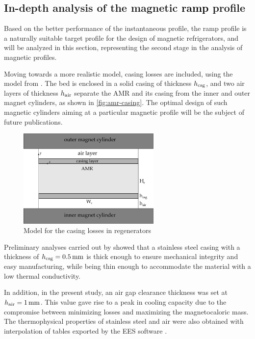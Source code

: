\documentclass[referee]{svjour3}
\begin{document}
\subsection{In-depth analysis of the  magnetic \textcolor{black}{ramp} profile}
\label{sec:performance-an-amr-1}

Based on the better performance of the instantaneous profile, the ramp profile is a naturally suitable target profile for the design of magnetic refrigerators, and will be analyzed in this section, representing the second stage in the analysis of magnetic profiles.

Moving towards a more realistic model, casing losses are included, using the model from \cite{bib:trevizoli16_perfor_model}. The bed is enclosed in a solid casing of thickness $h_{\mathrm{csg}}$, and two air layers of thickness $h_{\mathrm{air}}$ separate the AMR and its casing from the inner and outer magnet cylinders, as shown in \autoref{fig:amr-casing}. The optimal design of such magnetic cylinders aiming at a particular magnetic profile  will be the subject of future publications. 

\begin{figure}[!ht]
  \centering
  \includegraphics[width=7cm]{amr-casing}
  \caption{Model for the casing losses in regenerators}
  \label{fig:amr-casing}
\end{figure}


Preliminary analyses carried out by \cite{bib:peixer17-perfor-amrs} showed that a stainless steel casing with a thickness of $h\ped{csg} = \SI{0.5}{\mm}$ is thick enough to ensure mechanical integrity and easy manufacturing, while being thin enough to accommodate the material with a low thermal conductivity.

In addition, in the present study, an air gap clearance thickness was set at $h\ped{air} = \SI{1}{\mm}$. This value gave rise to a peak in cooling capacity due to the compromise between minimizing losses and maximizing the magnetocaloric mass.  The thermophysical properties of stainless steel and air were also obtained with interpolation of tables exported by the EES software \cite{bib:klein13-ees}.
\end{document}
